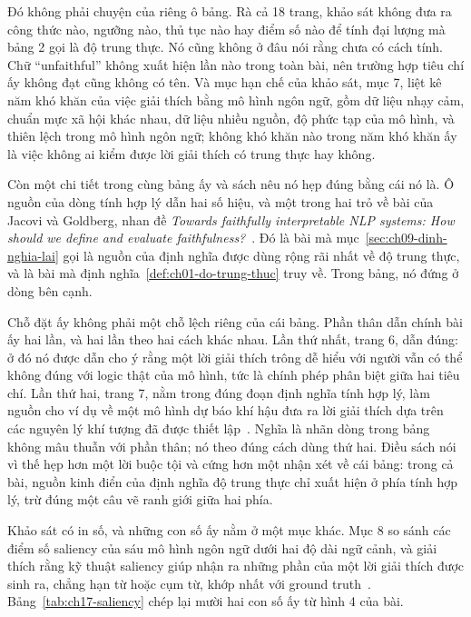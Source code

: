 Đó không phải chuyện của riêng ô bảng. Rà cả 18 trang, khảo sát không đưa ra
công thức nào, ngưỡng nào, thủ tục nào hay điểm số nào để tính đại lượng mà bảng
2 gọi là độ trung thực. Nó cũng không ở đâu nói rằng chưa có cách tính. Chữ
\enquote{unfaithful} không xuất hiện lần nào trong toàn bài, nên trường hợp tiêu
chí ấy không đạt cũng không có tên. Và mục hạn chế của khảo sát, mục 7, liệt kê
năm khó khăn của việc giải thích bằng mô hình ngôn ngữ, gồm dữ liệu nhạy cảm,
chuẩn mực xã hội khác nhau, dữ liệu nhiều nguồn, độ phức tạp của mô hình, và
thiên lệch trong mô hình ngôn ngữ; không khó khăn nào trong năm khó khăn ấy là
việc không ai kiểm được lời giải thích có trung thực hay không.

%
Còn một chi tiết trong cùng bảng ấy và sách nêu nó hẹp đúng bằng cái nó là. Ô
nguồn của dòng tính hợp lý dẫn hai số hiệu, và một trong hai trỏ về bài của
Jacovi và Goldberg, nhan đề \emph{Towards faithfully interpretable NLP systems:
How should we define and evaluate faithfulness?}~\autocite{p16llmxai}. Đó là bài
mà mục~\ref{sec:ch09-dinh-nghia-lai} gọi là nguồn của định nghĩa được dùng rộng
rãi nhất về độ trung thực, và là bài mà định nghĩa~\ref{def:ch01-do-trung-thuc}
truy về. Trong bảng, nó đứng ở dòng bên cạnh.

Chỗ đặt ấy không phải một chỗ lệch riêng của cái bảng. Phần thân dẫn chính bài
ấy hai lần, và hai lần theo hai cách khác nhau. Lần thứ nhất, trang 6, dẫn đúng:
ở đó nó được dẫn cho ý rằng một lời giải thích trông dễ hiểu với người vẫn có thể
không đúng với logic thật của mô hình, tức là chính phép phân biệt giữa hai tiêu
chí. Lần thứ hai, trang 7, nằm trong đúng đoạn định nghĩa tính hợp lý, làm nguồn
cho ví dụ về một mô hình dự báo khí hậu đưa ra lời giải thích dựa trên các nguyên
lý khí tượng đã được thiết lập~\autocite{p16llmxai}. Nghĩa là nhãn dòng trong
bảng không mâu thuẫn với phần thân; nó theo đúng cách dùng thứ hai. Điều sách nói
vì thế hẹp hơn một lời buộc tội và cứng hơn một nhận xét về cái bảng: trong cả
bài, nguồn kinh điển của định nghĩa độ trung thực chỉ xuất hiện ở phía tính hợp
lý, trừ đúng một câu vẽ ranh giới giữa hai phía.

%
Khảo sát có in số, và những con số ấy nằm ở một mục khác. Mục 8 so sánh các điểm
số saliency của sáu mô hình ngôn ngữ dưới hai độ dài ngữ cảnh, và giải thích rằng
kỹ thuật saliency giúp nhận ra những phần của một lời giải thích được sinh ra,
chẳng hạn từ hoặc cụm từ, khớp nhất với ground truth~\autocite{p16llmxai}.
Bảng~\ref{tab:ch17-saliency} chép lại mười hai con số ấy từ hình 4 của bài.

